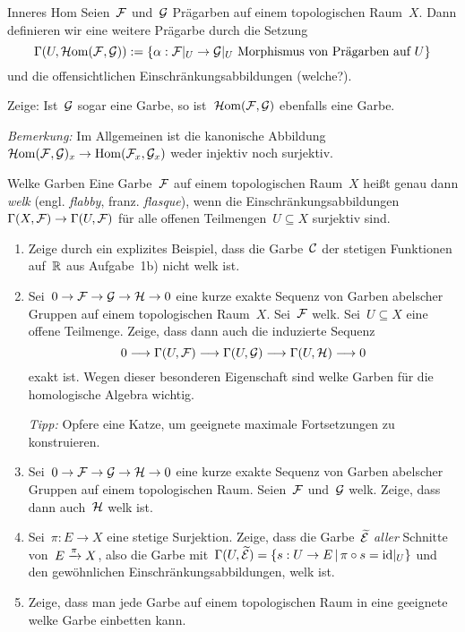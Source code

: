 \documentclass{uebblatt}
\begin{document}
\begin{aufgabe}{Inneres Hom}
Seien~$\mathcal{F}$ und~$\mathcal{G}$ Prägarben auf einem topologischen Raum~$X$. Dann
definieren wir eine weitere Prägarbe durch die Setzung
\[ \Gamma(U, \mathcal{H}\mathrm{om}(\mathcal{F},\mathcal{G})) := \{ \alpha : \mathcal{F}|_U \to \mathcal{G}|_U \text{ Morphismus von Prägarben auf~$U$} \} \]
und die offensichtlichen Einschränkungsabbildungen (welche?).

Zeige: Ist~$\mathcal{G}$ sogar eine Garbe, so ist~$\mathcal{H}\mathrm{om}(\mathcal{F},\mathcal{G})$ ebenfalls eine Garbe.

\emph{Bemerkung:} Im Allgemeinen ist die kanonische
Abbildung~$\mathcal{H}\mathrm{om}(\mathcal{F},\mathcal{G})_x \to \mathrm{Hom}(\mathcal{F}_x,\mathcal{G}_x)$ weder injektiv noch surjektiv.
\end{aufgabe}

\newpage

\begin{aufgabe}{Welke Garben}
Eine Garbe~$\mathcal{F}$ auf einem topologischen Raum~$X$ heißt genau dann \emph{welk}
(engl. \emph{flabby}, franz. \emph{flasque}),
wenn die Einschränkungsabbildungen~$\Gamma(X,\mathcal{F}) \to \Gamma(U,\mathcal{F})$ für alle
offenen Teilmengen~$U \subseteq X$ surjektiv sind.

\begin{enumerate}
\item Zeige durch ein explizites Beispiel, dass die Garbe~$\mathcal{C}$ der stetigen
Funktionen auf~$\mathbb{R}$ aus Aufgabe~1b) nicht welk ist.
\item Sei~$0 \to \mathcal{F} \to \mathcal{G} \to \mathcal{H} \to 0$ eine kurze exakte Sequenz von Garben
abelscher Gruppen auf einem topologischen Raum~$X$. Sei~$\mathcal{F}$ welk. Sei~$U
\subseteq X$ eine offene Teilmenge. Zeige, dass
dann auch die induzierte Sequenz
\[ 0 \longrightarrow \Gamma(U,\mathcal{F}) \longrightarrow \Gamma(U,\mathcal{G}) \longrightarrow \Gamma(U,\mathcal{H}) \longrightarrow 0 \]
exakt ist. Wegen dieser besonderen Eigenschaft sind welke Garben für die
homologische Algebra wichtig.

\emph{Tipp:} Opfere eine Katze, um geeignete maximale Fortsetzungen
zu konstruieren.
\item Sei~$0 \to \mathcal{F} \to \mathcal{G} \to \mathcal{H} \to 0$ eine kurze exakte Sequenz von Garben
abelscher Gruppen auf einem topologischen Raum. Seien~$\mathcal{F}$ und~$\mathcal{G}$ welk.
Zeige, dass dann auch~$\mathcal{H}$ welk ist.
\item Sei~$\pi : E \to X$ eine stetige Surjektion. Zeige, dass die
Garbe~$\widetilde{\mathcal{E}}$ \emph{aller} Schnitte von~$E \xrightarrow{\pi} X$, also die Garbe
mit~$\Gamma(U,\widetilde{\mathcal{E}}) = \{ s : U \to E \,|\, \pi
\circ s = \mathrm{id}|_U \}$ und den gewöhnlichen Einschränkungsabbildungen, welk ist.
\item Zeige, dass man jede Garbe auf einem topologischen Raum in eine geeignete
welke Garbe einbetten kann.
\end{enumerate}
\end{aufgabe}
\end{document}
